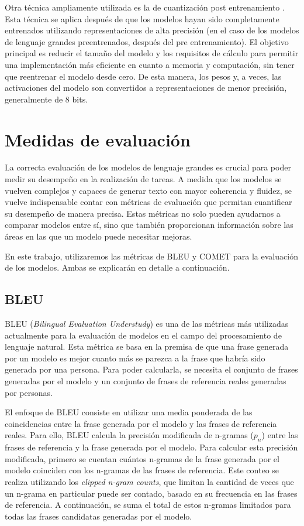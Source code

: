 \documentclass[11pt,spanish,listoffigures,listoftables]{tfgetsinf}
\begin{document}
Otra técnica ampliamente utilizada es la de cuantización post entrenamiento \cite{xiao2024smoothquantaccurateefficientposttraining}. Esta técnica se aplica después de que los modelos hayan sido completamente entrenados utilizando representaciones de alta precisión (en el caso de los modelos de lenguaje grandes preentrenados, después del pre entrenamiento). El objetivo principal es reducir el tamaño del modelo y los requisitos de cálculo para permitir una implementación más eficiente en cuanto a memoria y computación, sin tener que reentrenar el modelo desde cero. De esta manera, los pesos y, a veces, las activaciones del modelo son convertidos a representaciones de menor precisión, generalmente de 8 bits.

\section{Medidas de evaluación} \label{metricas}

La correcta evaluación de los modelos de lenguaje grandes es crucial para poder medir su desempeño en la realización de tareas. A medida que los modelos se vuelven complejos y capaces de generar texto con mayor coherencia y fluidez, se vuelve indispensable contar con métricas de evaluación que permitan cuantificar su desempeño de manera precisa. Estas métricas no solo pueden ayudarnos a comparar modelos entre sí, sino que también proporcionan información sobre las áreas en las que un modelo puede necesitar mejoras.

En este trabajo, utilizaremos las métricas de BLEU y COMET para la evaluación de los modelos. Ambas se explicarán en detalle a continuación.

\subsection{BLEU}

BLEU (\textit{Bilingual Evaluation Understudy}) \cite{papineni-etal-2002-bleu} es una de las métricas más utilizadas actualmente para la evaluación de modelos en el campo del procesamiento de lenguaje natural. Esta métrica se basa en la premisa de que una frase generada por un modelo es mejor cuanto más se parezca a la frase que habría sido generada por una persona. Para poder calcularla, se necesita el conjunto de frases generadas por el modelo y un conjunto de frases de referencia reales generadas por personas.

El enfoque de BLEU consiste en utilizar una media ponderada de las coincidencias entre la frase generada por el modelo y las frases de referencia reales. Para ello, BLEU calcula la precisión modificada de n-gramas ($p_n$) entre las frases de referencia y la frase generada por el modelo. Para calcular esta precisión modificada, primero se cuentan cuántos n-gramas de la frase generada por el modelo coinciden con los n-gramas de las frases de referencia. Este conteo se realiza utilizando los \textit{clipped n-gram counts}, que limitan la cantidad de veces que un n-grama en particular puede ser contado, basado en su frecuencia en las frases de referencia. A continuación, se suma el total de estos n-gramas limitados para todas las frases candidatas generadas por el modelo.
\end{document}
